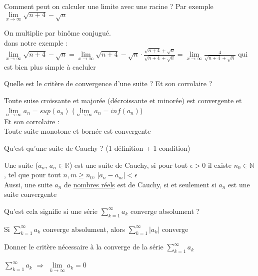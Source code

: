 \documentclass[12pt]{article}
\newcommand*{\xfield}[1]{\begin{mdframed}\centering #1\end{mdframed}\bigskip}
\newenvironment{note}{}{}
\begin{document}
\begin{note}
    \xfield{Comment peut on calculer une limite avec une racine ? Par exemple \\ $\lim\limits_{x \to \infty} \sqrt{n+4} - \sqrt{n}$}
    \xfield{On multiplie par binôme conjugué.\\dans notre exemple :\\ $\lim\limits_{x  \to \infty} \sqrt{n+4} - \sqrt{n} = \lim\limits_{x \to \infty} \sqrt{n+4} - \sqrt{n} \cdot \frac{\sqrt{n+4} + \sqrt{n}}{\sqrt{n+4} + \sqrt{n}} = \lim\limits_{x \to \infty} \frac{4}{\sqrt{n+4} + \sqrt{n}}$ qui est bien plus simple à cacluler}
\end{note}

\begin{note}
    \xfield{Quelle est le critère de convergence d'une suite ? Et son corrolaire ?}
    \xfield{
        Toute suise croissante et majorée (décroissante et minorée) est convergente et $\lim\limits_{n \to \infty} a_n = sup(a_n)$ ($\lim\limits_{n \to \infty} a_n = inf(a_n)$) \\
        Et son corrolaire : \\
        Toute suite monotone et bornée est convergente
    }
\end{note}

\begin{note}
    \xfield{Qu'est qu'une suite de Cauchy ? (1 définition + 1 condition)}
    \xfield{
        Une suite ($a_n$, $a_n \in \mathbb{R}$) est une suite de Cauchy, si pour tout $\epsilon > 0$ il existe $n_0 \in \mathbb{N}$, tel que pour tout $n,m \ge n_0$, $ | a_n - a_m | < \epsilon$\\
        Aussi, une suite $a_n$ de \underline{nombres réels} est de Cauchy, si et seulement si $a_n$ est une suite convergente
    }
\end{note}

\begin{note}
	\xfield{Qu'est cela signifie si une série $\sum\limits^{\infty}_{k=1} a_k$ converge absolument ?}
	\xfield{Si $\sum\limits^{\infty}_{k=1} a_k$ converge absolument, alors $\sum\limits^{\infty}_{k=1} \vert a_k\vert$ converge }
\end{note}

\begin{note}
	\xfield{Donner le critère nécessaire à la converge de la série $\sum\limits^{\infty}_{k=1} a_k$}
	\xfield{$\sum\limits^{\infty}_{k=1} a_k$ $\Rightarrow$ $\lim\limits_{k\to \infty}a_k = 0$}
\end{note}
\end{document}

